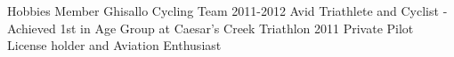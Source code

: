 \begin{category}{Hobbies}
\citembullet Member Ghisallo Cycling Team 2011-2012
\citembullet Avid Triathlete and Cyclist - Achieved 1st in Age Group at Caesar's Creek Triathlon 2011
\citembullet Private Pilot License holder and Aviation Enthusiast 
\end{category}
